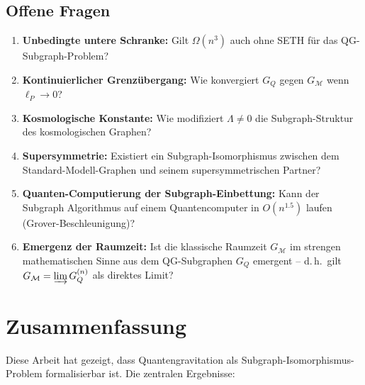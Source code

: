 ﻿\documentclass[a4paper,12pt]{article}
\theoremstyle{definition}
\begin{document}
\subsection{Offene Fragen}

\begin{enumerate}
	\item \textbf{Unbedingte untere Schranke:} Gilt $\Omega(n^3)$ auch
	      ohne SETH f\"ur das QG-Subgraph-Problem?

	\item \textbf{Kontinuierlicher Grenz\"ubergang:} Wie konvergiert
	      $G_Q$ gegen $G_{\mathcal{M}}$ wenn $\ell_P \to 0$?

	\item \textbf{Kosmologische Konstante:} Wie modifiziert $\Lambda \neq 0$
	      die Subgraph-Struktur des kosmologischen Graphen?

	\item \textbf{Supersymmetrie:} Existiert ein Subgraph-Isomorphismus
	      zwischen dem Standard-Modell-Graphen und seinem
	      supersymmetrischen Partner?

	\item \textbf{Quanten-Computierung der Subgraph-Einbettung:}
	      Kann der Subgraph Algorithmus auf einem Quantencomputer
	      in $O(n^{1.5})$ laufen (Grover-Beschleunigung)?

	\item \textbf{Emergenz der Raumzeit:} Ist die klassische Raumzeit
	      $G_{\mathcal{M}}$ im strengen mathematischen Sinne aus
	      dem QG-Subgraphen $G_Q$ emergent -- d.\,h.\ gilt
	      $G_{\mathcal{M}} = \varinjlim G_Q^{(n)}$ als direktes Limit?
\end{enumerate}

\section{Zusammenfassung}

Diese Arbeit hat gezeigt, dass Quantengravitation als
Subgraph-Isomorphismus-Problem formalisierbar ist. Die zentralen Ergebnisse:
\end{document}
